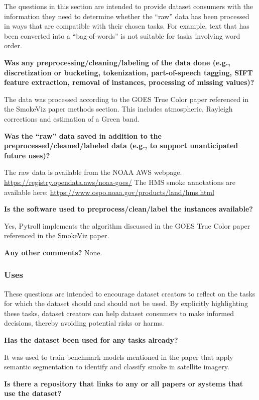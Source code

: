 \documentclass{article}
\begin{document}
The questions in this section are intended to provide dataset consumers with the information they need to determine whether the “raw” data has been processed in ways that are compatible with their chosen tasks. For example, text that has been converted into a “bag-of-words” is not suitable for tasks involving word order.

\textbf{Was any preprocessing/cleaning/labeling of the data done (e.g., discretization or bucketing, tokenization, part-of-speech tagging, SIFT feature extraction, removal of instances, processing of missing values)?}

The data was processed according to the GOES True Color paper referenced in the SmokeViz paper methods section. This includes atmospheric, Rayleigh corrections and estimation of a Green band.

\textbf{Was the “raw” data saved in addition to the preprocessed/cleaned/labeled data (e.g., to support unanticipated future uses)?}

The raw data is available from the NOAA AWS webpage.
\url{https://registry.opendata.aws/noaa-goes/}
The HMS smoke annotations are available here:
\url{https://www.ospo.noaa.gov/products/land/hms.html}

\textbf{Is the software used to preprocess/clean/label the instances available?}


Yes, Pytroll implements the algorithm discussed in the GOES True Color paper referenced in the SmokeViz paper.

\textbf{Any other comments?}
None.

\subsubsection{Uses}

These questions are intended to encourage dataset creators to reflect on the tasks for which the dataset should and should not be used. By explicitly highlighting these tasks, dataset creators can help dataset consumers to make informed decisions, thereby avoiding potential risks or harms.

\textbf{Has the dataset been used for any tasks already?}

It was used to train benchmark models mentioned in the paper that apply semantic segmentation to identify and classify smoke in satellite imagery.

\textbf{Is there a repository that links to any or all papers or systems that use the dataset?}
\end{document}
